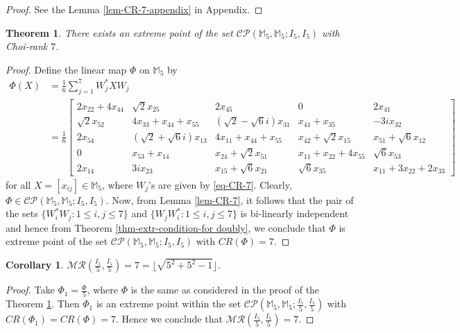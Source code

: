 \documentclass[10pt,reqno]{amsart}
\theoremstyle{definition}
\theoremstyle{plain}
\newtheorem{thm}[defn]{Theorem}
\newtheorem{cor}[defn]{Corollary}
\theoremstyle{remark}
\newcommand{\mbb}[1]{\mathbb{#1}}
\newcommand{\msc}[1]{\mathscr{#1}}
\newcommand{\M}[1]{\mbb{M}_{#1}}%
\newcommand{\Matrix}[1]{\begin{bmatrix}#1\end{bmatrix}}
\numberwithin{equation}{section}%
\begin{document}
\begin{proof}
	See the Lemma \ref{lem-CR-7-appendix} in Appendix.
\end{proof}



\begin{thm}\label{thm-CR-7}
	There exists an extreme point of the set $\msc{CP}(\M{5},\M{5}; I_{5}, I_{5})$ with Choi-rank $7$.
\end{thm}



\begin{proof}
	Define the linear map $\Phi$ on $\M{5}$ by
	\small
	\begin{align*}
		\Phi(X)
		&=\frac{1}{6}\sum_{j=1}^{7}W_j^*XW_j\\
		&=\frac{1}{6}\Matrix{2x_{22}+4x_{44}&\sqrt{2}x_{25}&2x_{45}&0&2x_{41}\\
			\sqrt{2}x_{52}&4x_{33}+x_{44}+x_{55}&(\sqrt{2}-\sqrt{6}i)x_{31}&x_{41}+x_{35}&-3ix_{32}\\
			2x_{54}&(\sqrt{2}+\sqrt{6}i)x_{13}&4x_{11}+x_{44}+x_{55}&x_{42}+\sqrt{2}x_{15}&x_{51}+\sqrt{6}x_{12}\\
			0&x_{53}+x_{14}&x_{24}+\sqrt{2}x_{51}&x_{11}+x_{22}+4x_{55}&\sqrt{6}x_{53}\\
			2x_{14}&3ix_{23}&x_{15}+\sqrt{6}x_{21}&\sqrt{6}x_{35}&x_{11}+3x_{22}+2x_{33}}
	\end{align*}
	\normalsize
	for all $X=[x_{ij}]\in\M{5}$, where $W_j$'s are given by \eqref{eq-CR-7}. Clearly, $\Phi\in\msc{CP}(\M{5},\M{5}; I_{5}, I_{5})$. Now, from Lemma \ref{lem-CR-7}, it follows that the pair of the sets $\{W_i^*W_j:1\leq i,j\leq 7\}$ and $\{W_jW_i^*:1\leq i,j\leq 7\}$ is bi-linearly independent and hence from Theorem \ref{thm-extr-condition-for doubly}, we conclude that $\Phi$ is extreme point of the set $\msc{CP}(\M{5},\M{5}; I_{5}, I_{5})$ with $CR(\Phi)=7$.
\end{proof}


\begin{cor}
	$\msc{MR}(\frac{I_{5}}{5},\frac{I_{5}}{5})=7=\lfloor{\sqrt{5^2+5^2-1}}\rfloor$.
\end{cor}


\begin{proof}
	Take $\Phi_1=\frac{\Phi}{5}$, where $\Phi$ is the same as considered in the proof of the Theorem \ref{thm-CR-7}. Then $\Phi_1$ is an extreme point within the set $\msc{CP}(\M{5},\M{5}; \frac{I_{5}}{5},\frac{I_{5}}{5})$ with $CR(\Phi_1)=CR(\Phi)=7$. Hence we conclude that $\msc{MR}(\frac{I_{5}}{5},\frac{I_{5}}{5})=7$.
\end{proof}
\end{document}
